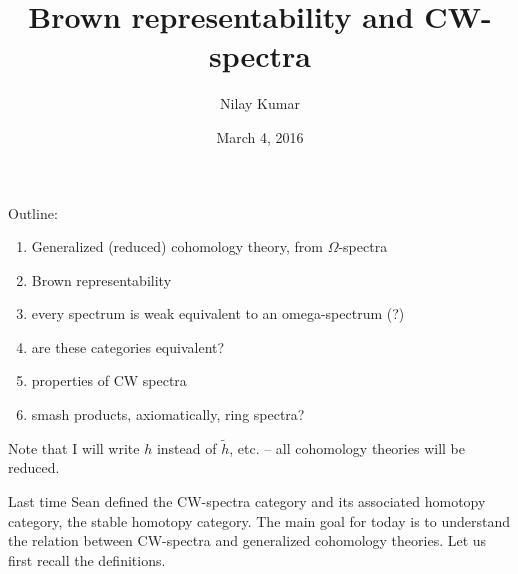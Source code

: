 \documentclass{amsart}
\title{Brown representability and CW-spectra}
\author{Nilay Kumar}
\date{March 4, 2016}
\begin{document}
\maketitle

Outline:
\begin{enumerate}
    \item Generalized (reduced) cohomology theory, from $\Omega$-spectra
    \item Brown representability
    \item every spectrum is weak equivalent to an omega-spectrum (?)
    \item are these categories equivalent?
    \item properties of CW spectra
    \item smash products, axiomatically, ring spectra?
\end{enumerate}

Note that I will write $h$ instead of $\tilde h$, etc. -- all cohomology theories will be reduced.

Last time Sean defined the CW-spectra category and its associated homotopy category, the stable homotopy category.
The main goal for today is to understand the relation between CW-spectra and generalized cohomology theories. Let
us first recall the definitions.
\end{document}
